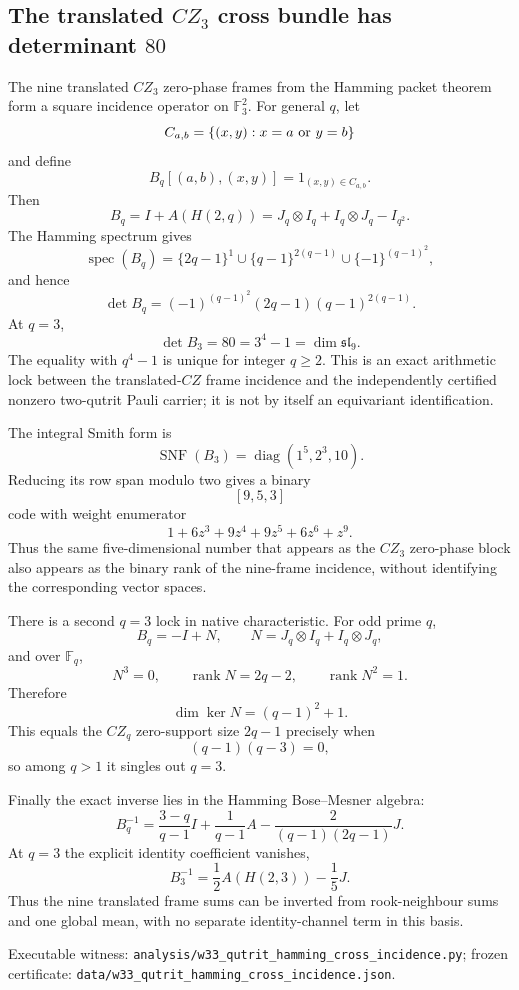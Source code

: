 \subsection{The translated \(CZ_3\) cross bundle has determinant \(80\)}
\label{sec:20260919-qutrit-hamming-cross-incidence}

The nine translated \(CZ_3\) zero-phase frames from the Hamming packet theorem
form a square incidence operator on \(\mathbb F_3^2\).  For general \(q\), let
\[
 C_{a,b}=\{(x,y):x=a\ \hbox{or}\ y=b\}
\]
and define
\[
 B_q[(a,b),(x,y)]=1_{(x,y)\in C_{a,b}}.
\]
Then
\[
 B_q=I+A(H(2,q))
    =J_q\otimes I_q+I_q\otimes J_q-I_{q^2}.
\]
The Hamming spectrum gives
\[
 \operatorname{spec}(B_q)
 =\{2q-1\}^{1}\cup\{q-1\}^{2(q-1)}
   \cup\{-1\}^{(q-1)^2},
\]
and hence
\[
 \det B_q=(-1)^{(q-1)^2}(2q-1)(q-1)^{2(q-1)}.
\]
At \(q=3\),
\[
 \boxed{\det B_3=80=3^4-1=\dim\mathfrak{sl}_9.}
\]
The equality with \(q^4-1\) is unique for integer \(q\ge2\).  This is an exact
arithmetic lock between the translated-\(CZ\) frame incidence and the
independently certified nonzero two-qutrit Pauli carrier; it is not by itself
an equivariant identification.

The integral Smith form is
\[
 \operatorname{SNF}(B_3)=
 \operatorname{diag}(1^5,2^3,10).
\]
Reducing its row span modulo two gives a binary
\[
 [9,5,3]
\]
code with weight enumerator
\[
 1+6z^3+9z^4+9z^5+6z^6+z^9.
\]
Thus the same five-dimensional number that appears as the \(CZ_3\) zero-phase
block also appears as the binary rank of the nine-frame incidence, without
identifying the corresponding vector spaces.

There is a second \(q=3\) lock in native characteristic.  For odd prime \(q\),
\[
 B_q=-I+N,\qquad
 N=J_q\otimes I_q+I_q\otimes J_q,
\]
and over \(\mathbb F_q\),
\[
 N^3=0,\qquad
 \operatorname{rank}N=2q-2,\qquad
 \operatorname{rank}N^2=1.
\]
Therefore
\[
 \dim\ker N=(q-1)^2+1.
\]
This equals the \(CZ_q\) zero-support size \(2q-1\) precisely when
\[
 (q-1)(q-3)=0,
\]
so among \(q>1\) it singles out \(q=3\).

Finally the exact inverse lies in the Hamming Bose--Mesner algebra:
\[
 B_q^{-1}
 =\frac{3-q}{q-1}I+\frac1{q-1}A
  -\frac{2}{(q-1)(2q-1)}J.
\]
At \(q=3\) the explicit identity coefficient vanishes,
\[
 \boxed{B_3^{-1}=\frac12A(H(2,3))-\frac15J.}
\]
Thus the nine translated frame sums can be inverted from rook-neighbour sums
and one global mean, with no separate identity-channel term in this basis.

Executable witness:
\texttt{analysis/w33\_qutrit\_hamming\_cross\_incidence.py};
frozen certificate:
\texttt{data/w33\_qutrit\_hamming\_cross\_incidence.json}.
